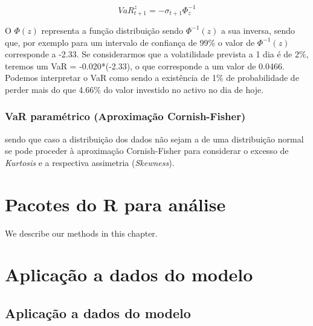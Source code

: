 \documentclass[
  12pt,
  a4paper,
  openany]{book}
\begin{document}
\justifying
\bigskip

\begin{equation} 
  VaR_{t+1}^{z} = -\sigma_{t+1}\Phi_{z}^{-1}
  \label{eq:var}
\end{equation}

O \(\Phi (z)\) representa a função distribuição sendo \(\Phi^{-1} (z)\) a sua inversa, sendo que, por exemplo para um intervalo de confiança de 99\% o valor de \(\Phi^{-1} (z)\) corresponde a -2.33. Se considerarmos que a volatilidade prevista a 1 dia é de 2\%, teremos um VaR = -0.020*(-2.33), o que corresponde a um valor de 0.0466. Podemos interpretar o VaR como sendo a existência de 1\% de probabilidade de perder mais do que 4.66\% do valor investido no activo no dia de hoje.

\hypertarget{var-paramuxe9trico-aproximauxe7uxe3o-cornish-fisher}{%
\subsection{VaR paramétrico (Aproximação Cornish-Fisher)}\label{var-paramuxe9trico-aproximauxe7uxe3o-cornish-fisher}}

sendo que caso a distribuição dos dados não sejam a de uma distribuição normal se pode proceder à aproximação Cornish-Fisher para considerar o excesso de \emph{Kurtosis} e a respectiva assimetria (\emph{Skewness}).

\hypertarget{pacotes-do-r-para-anuxe1lise}{%
\chapter{Pacotes do R para análise}\label{pacotes-do-r-para-anuxe1lise}}

\newpage

We describe our methods in this chapter.

\hypertarget{aplicauxe7uxe3o-a-dados-do-modelo}{%
\chapter{Aplicação a dados do modelo}\label{aplicauxe7uxe3o-a-dados-do-modelo}}

\endgroup
\newpage

\hypertarget{aplicauxe7uxe3o-a-dados-do-modelo-1}{%
\section{Aplicação a dados do modelo}\label{aplicauxe7uxe3o-a-dados-do-modelo-1}}
\end{document}
